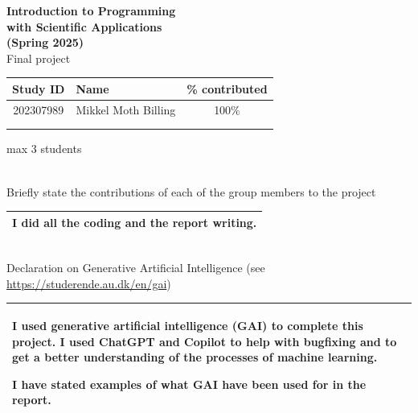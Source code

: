 \documentclass[a4paper,oneside,article]{memoir}
\begin{document}

\thispagestyle{empty}
\setcounter{page}{0}

\begin{center}
  \huge
  \textbf{Introduction to Programming \\
  with Scientific Applications \\
  (Spring 2025)} \\[2ex]
  Final project \\[3ex]
\end{center}
\noindent
\begin{tabularx}{\textwidth}{|c|X|c|}
\multicolumn{1}{c}{Study ID} & 
\multicolumn{1}{l}{Name} & 
\multicolumn{1}{l}{\% contributed} \\
\hline
202307989 & Mikkel Moth Billing & 100\% \\ %
\hline
& & \\ %
\hline
& & \\ %
\hline
\end{tabularx}
\centerline{max 3 students}
\\[2ex]
\noindent
Briefly state the contributions of each of the group members to the project
\\
\begin{tabularx}{\textwidth}{|X|}
\hline
I did all the coding and the report writing.  
\\[2ex]
\hline 
\end{tabularx}
\\[2ex]
\noindent
Declaration on Generative Artificial Intelligence (see \url{https://studerende.au.dk/en/gai})
\\
\begin{tabularx}{\textwidth}{|X|}
\hline
\textbf{I used generative artificial intelligence (GAI) to complete this project. }
I used ChatGPT and Copilot to help with bugfixing and to get a better understanding of the processes of machine learning. 

I have stated examples of what GAI have been used for in the report.  
\\[3cm]
\hline 
\end{tabularx}
\end{document}
